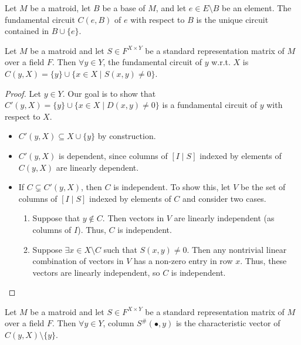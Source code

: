 \begin{definition}\label{def:fundamental_circuit}
    Let $M$ be a matroid, let $B$ be a base of $M$, and let $e \in E \setminus B$ be an element. The fundamental circuit $C (e, B)$ of $e$ with respect to $B$ is the unique circuit contained in $B \cup \{e\}$.
\end{definition}

\begin{lemma}\label{lem:std_repr_fundamental_circuits}
    Let $M$ be a matroid and let $S \in F^{X \times Y}$ be a standard representation matrix of $M$ over a field $F$. Then $\forall y \in Y$, the fundamental circuit of $y$ w.r.t. $X$ is $C (y, X) = \{y\} \cup \{x \in X \mid S (x, y) \neq 0\}$.
\end{lemma}

\begin{proof}
    Let $y \in Y$. Our goal is to show that $C' (y, X) = \{y\} \cup \{x \in X \mid D (x, y) \neq 0\}$ is a fundamental circuit of $y$ with respect to $X$.
    \begin{itemize}
        \item $C' (y, X) \subseteq X \cup \{y\}$ by construction.
        \item $C' (y, X)$ is dependent, since columns of $[I \mid S]$ indexed by elements of $C (y, X)$ are linearly dependent.
        \item If $C \subsetneq C' (y, X)$, then $C$ is independent. To show this, let $V$ be the set of columns of $[I \mid S]$ indexed by elements of $C$ and consider two cases.
        \begin{enumerate}
            \item Suppose that $y \notin C$. Then vectors in $V$ are linearly independent (as columns of $I$). Thus, $C$ is independent.
            \item Suppose $\exists x \in X \setminus C$ such that $S (x, y) \neq 0$. Then any nontrivial linear combination of vectors in $V$ has a non-zero entry in row $x$. Thus, these vectors are linearly independent, so $C$ is independent.
        \end{enumerate}
    \end{itemize}
\end{proof}

\begin{lemma}\label{lem:std_repr_support_matrix_cols}
    Let $M$ be a matroid and let $S \in F^{X \times Y}$ be a standard representation matrix of $M$ over a field $F$. Then $\forall y \in Y$, column $S^{\#} (\bullet, y)$ is the characteristic vector of $C (y, X) \setminus \{y\}$.
\end{lemma}

